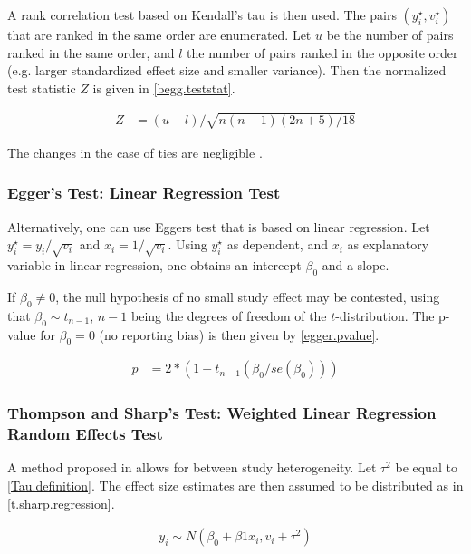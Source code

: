 \documentclass[11pt,a4paper,twoside]{book}\usepackage[]{graphicx}\usepackage[]{color}
\begin{document}
A rank correlation test based on Kendall's tau is then used. The pairs $(y_{i}^\star, v_{i}^\star)$ that are ranked in the same order are enumerated. Let $u$ be the number of pairs ranked in the same order, and $l$ the number of pairs ranked in the opposite order (e.g. larger standardized effect size and smaller variance). Then the normalized test statistic $Z$ is given in \ref{begg.teststat}. 

\begin{align}
Z &= (u - l)/\sqrt{n(n-1)(2n + 5)/18} \label{begg.teststat}
\end{align}

The changes in the case of ties are negligible \cite[410]{begg.ties}.

\subsubsection{Egger's Test: Linear Regression Test}
Alternatively, one can use Eggers test \citep{Egger} that is based on linear regression. Let $y_{i}^\star = y_{i}/\sqrt{v_{i}}$ and $x_{i} = 1/\sqrt{v_{i}}$. 
Using $y_{i}^\star$ as dependent, and  $x_{i}$ as explanatory variable in linear regression, one obtains an intercept $\beta_{0}$ and a slope. 

\vspace{0mm}
If $\beta_{0} \ne 0$, the null hypothesis of no small study effect may be contested, using that $\beta_{0} \sim t_{n-1}$, $n-1$ being the degrees of freedom of the $t$-distribution. The p-value for $\beta_{0} = 0$ (no reporting bias) is then given by \ref{egger.pvalue}.

\begin{align}
p &= 2*(1 - t_{n-1}(\beta_{0}/se(\beta_{0}))) \label{egger.pvalue}
\end{align}

\subsubsection{Thompson and Sharp's Test: Weighted Linear Regression Random Effects Test}
A method proposed in \citet{thompson.sharp} allows for between study heterogeneity. Let $\tau^2$ be equal to \ref{Tau.definition}. The effect size estimates are then assumed to be distributed as in \ref{t.sharp.regression}. 

\begin{align}
y_{i} \sim N(\beta_{0} + \beta{1}x_{i}, v_{i} + \tau^2) \label{t.sharp.regression}
\end{align}
\end{document}
